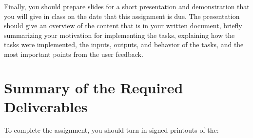 Finally, you should prepare slides for a short presentation and demonstration that you will give in class on the date
that this assignment is due.  The presentation should give an overview of the content that is in your written document,
briefly summarizing your motivation for implementing the tasks, explaining how the tasks were implemented, the inputs,
outputs, and behavior of the tasks, and the most important points from the user feedback.

\section*{Summary of the Required Deliverables}

To complete the assignment, you should turn in signed printouts of the: 




